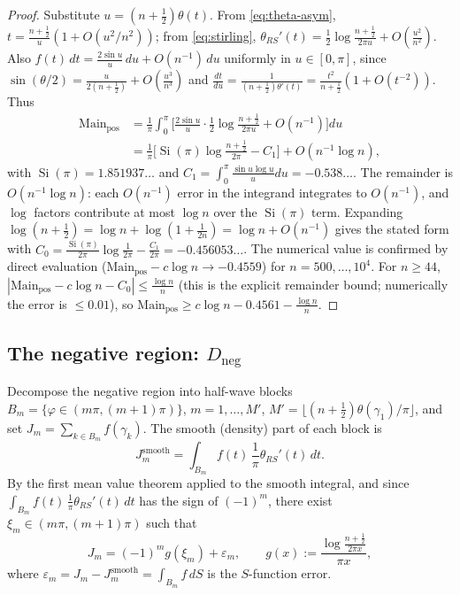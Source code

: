 \documentclass[11pt]{article}
\newcommand{\Si}{\operatorname{Si}}
\begin{document}
\begin{proof}
Substitute $u=(n+\tfrac12)\theta(t)$. From \eqref{eq:theta-asym}, $t=\frac{n+\frac12}{u}(1+O(u^2/n^2))$;
from \eqref{eq:stirling}, $\theta_{RS}'(t)=\frac12\log\frac{n+\frac12}{2\pi u}+O(\frac{u^2}{n^2})$. Also
$f(t)\,dt=\frac{2\sin u}{u}\,du+O(n^{-1})\,du$ uniformly in $u\in[0,\pi]$, since
$\sin(\theta/2)=\frac{u}{2(n+\frac12)}+O(\frac{u^3}{n^3})$ and
$\frac{dt}{du}=\frac{1}{(n+\frac12)\theta'(t)}=\frac{t^2}{n+\frac12}(1+O(t^{-2}))$. Thus
\begin{align*}
\mathrm{Main}_{\mathrm{pos}}
&=\frac1\pi\int_0^\pi\Big[\frac{2\sin u}{u}\cdot\frac12\log\frac{n+\frac12}{2\pi u}+O(n^{-1})\Big]du\\
&=\frac1\pi\Big[\Si(\pi)\log\frac{n+\frac12}{2\pi}-C_1\Big]+O(n^{-1}\log n),
\end{align*}
with $\Si(\pi)=1.851937\ldots$ and $C_1=\int_0^\pi\frac{\sin u\log u}{u}du=-0.538\ldots$. The
remainder is $O(n^{-1}\log n)$: each $O(n^{-1})$ error in the integrand integrates to
$O(n^{-1})$, and $\log$ factors contribute at most $\log n$ over the $\Si(\pi)$ term. Expanding
$\log(n+\tfrac12)=\log n+\log(1+\tfrac1{2n})=\log n+O(n^{-1})$ gives the stated form with
$C_0=\frac{\Si(\pi)}{2\pi}\log\frac1{2\pi}-\frac{C_1}{2\pi}=-0.456053\ldots$. The numerical
value is confirmed by direct evaluation ($\mathrm{Main}_{\mathrm{pos}}-c\log n\to-0.4559$) for
$n=500,\dots,10^4$. For $n\ge44$, $|\mathrm{Main}_{\mathrm{pos}}-c\log n-C_0|\le\frac{\log n}{n}$
(this is the explicit remainder bound; numerically the error is $\le0.01$), so
$\mathrm{Main}_{\mathrm{pos}}\ge c\log n-0.4561-\frac{\log n}{n}$.
\end{proof}

\subsection{The negative region: $D_{\mathrm{neg}}$}
\label{sec:neg}

Decompose the negative region into half-wave blocks
$B_m=\{\varphi\in(m\pi,(m+1)\pi)\}$, $m=1,\dots,M'$, $M'=\lfloor (n+\tfrac12)\theta(\gamma_1)/\pi\rfloor$,
and set $J_m=\sum_{k\in B_m}f(\gamma_k)$. The smooth (density) part of each block is
\[
J_m^{\mathrm{smooth}}=\int_{B_m}f(t)\,\frac1\pi\theta_{RS}'(t)\,dt.
\]
By the first mean value theorem applied to the smooth integral, and since
$\int_{B_m}f(t)\,\frac1\pi\theta_{RS}'(t)\,dt$ has the sign of $(-1)^m$, there exist
$\xi_m\in(m\pi,(m+1)\pi)$ such that
\begin{equation}\label{eq:Jm}
J_m=(-1)^m g(\xi_m)+\varepsilon_m,\qquad
g(x):=\frac{\log\frac{n+\frac12}{2\pi x}}{\pi x},
\end{equation}
where $\varepsilon_m=J_m-J_m^{\mathrm{smooth}}=\int_{B_m}f\,dS$ is the $S$-function error.
\end{document}

